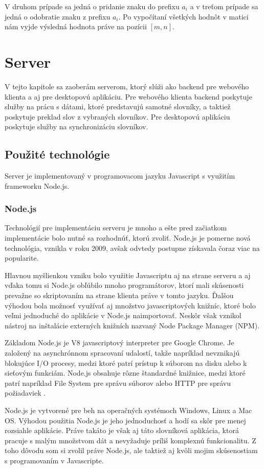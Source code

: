 \documentclass[
  digital, %
  table,   %
  lof,     %
  lot,     %
]{fithesis3}
\begin{document}
V druhom prípade sa jedná o pridanie znaku do prefixu $a_i$ a v treťom prípade sa jedná o odobratie znaku z prefixu $a_i$. Po vypočítaní všetkých hodnôt v matici nám vyjde výsledná hodnota práve na pozícii $[m,n]$.



\chapter{Server}
V tejto kapitole sa zaoberám serverom, ktorý slúži ako backend pre webového klienta a aj pre desktopovú aplikáciu. Pre webového klienta backend poskytuje služby na prácu s dátami, ktoré predstavujú samotné slovníky, a taktiež poskytuje preklad slov z vybraných slovníkov. Pre desktopovú aplikáciu poskytuje služby na synchronizáciu slovníkov.

\section{Použité technológie}
Server je implementovaný v programovacom jazyku Javascript s využitím frameworku Node.js.

\subsection{Node.js}
Technológií pre implementáciu serveru je mnoho a ešte pred začiatkom implementácie bolo nutné sa rozhodnúť, ktorú zvoliť. Node.js je pomerne nová technológia, vznikla v roku 2009, avšak odvtedy postupne získavala čoraz viac na popularite.

Hlavnou myšlienkou vzniku bolo využitie Javascriptu aj na strane serveru a aj vďaka tomu si Node.js obľúbilo mnoho programátorov, ktorí mali skúsenosti prevažne so skriptovaním na strane klienta práve v tomto jazyku. Ďalšou výhodou bola možnosť využívať aj množstvo javascriptových knižníc, ktoré bolo veľmi jednoduché do aplikácie v Node.js naimportovať. Neskôr však vznikol nástroj na inštalácie externých knižních nazvaný Node Package Manager (NPM).

Základom Node.js je V8 javascriptový interpreter pre Google Chrome. Je založený na asynchrónnom spracovaní udalostí, takže napríklad nevznikajú blokujúce I/O procesy, medzi ktoré patrí prístup k súborom na disku alebo k sieťovým funkciám. Node.js obsahuje rôzne štandardné knižnice, medzi ktoré patrí napríklad File System pre správu súborov alebo HTTP pre správu požiadaviek \parencite{krause2017introduction}.

Node.js je vytvorené pre beh na operačných systémoch Windows, Linux a Mac OS. Výhodou použitia Node.js je jeho jednoduchosť a hodí sa skôr pre menej rozsiahle aplikácie. Práve takáto je však aj táto slovníková aplikácia, ktorá pracuje s malým množstvom dát a nevyžaduje príliš komplexnú funkcionalitu. Z toho dôvodu som si zvolil práve Node.js, ale taktiež aj kvôli mojim skúsenostiam s programovaním v Javascripte.
\end{document}
